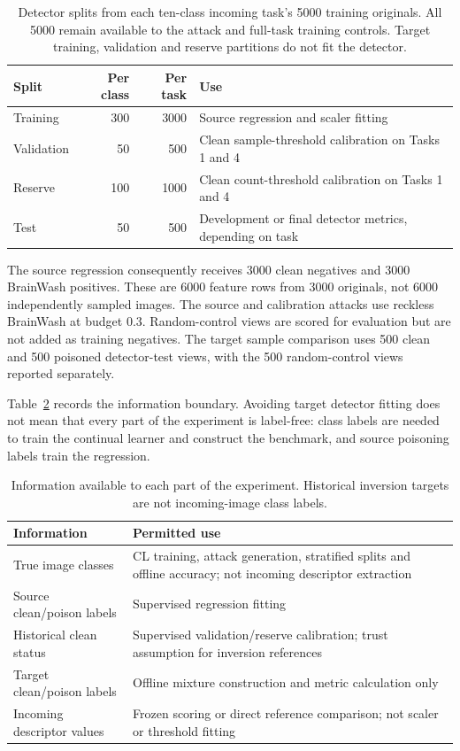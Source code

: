 \begin{table}[tbp]
\centering
\begin{tabular}{lrrp{6.0cm}}
\toprule
Split & Per class & Per task & Use\\
\midrule
Training & 300 & 3000 & Source regression and scaler fitting\\
Validation & 50 & 500 & Clean sample-threshold calibration on Tasks 1 and 4\\
Reserve & 100 & 1000 & Clean count-threshold calibration on Tasks 1 and 4\\
Test & 50 & 500 & Development or final detector metrics, depending on task\\
\bottomrule
\end{tabular}
\caption{Detector splits from each ten-class incoming task's 5000 training
originals. All 5000 remain available to the attack and full-task training
controls. Target training, validation and reserve partitions do not fit
the detector.}
\label{tab:setup-splits}
\end{table}

The source regression consequently receives 3000 clean negatives and 3000
BrainWash positives. These are 6000 feature rows from 3000 originals, not
6000 independently sampled images. The source and calibration attacks use
reckless BrainWash at budget 0.3. Random-control views are scored for
evaluation but are not added as training negatives. The target sample
comparison uses 500 clean and 500 poisoned detector-test views, with the
500 random-control views reported separately.

Table~\ref{tab:setup-information} records the information boundary. Avoiding
target detector fitting does not mean that every part of the experiment is
label-free: class labels are needed to train the continual learner and
construct the benchmark, and source poisoning labels train the regression.

\begin{table}[tbp]
\centering
\small
\begin{tabularx}{\textwidth}{p{5.0cm}X}
\toprule
Information & Permitted use\\
\midrule
True image classes & CL training, attack generation, stratified splits and offline accuracy; not incoming descriptor extraction\\
Source clean/poison labels & Supervised regression fitting\\
Historical clean status & Supervised validation/reserve calibration; trust assumption for inversion references\\
Target clean/poison labels & Offline mixture construction and metric calculation only\\
Incoming descriptor values & Frozen scoring or direct reference comparison; not scaler or threshold fitting\\
\bottomrule
\end{tabularx}
\caption{Information available to each part of the experiment. Historical
inversion targets are not incoming-image class labels.}
\label{tab:setup-information}
\end{table}

